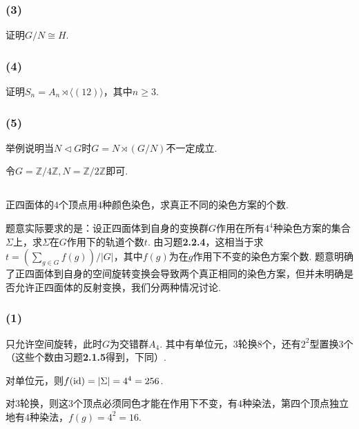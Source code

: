 
\subsubsection{(3)}
证明$G/N\cong H$.

\Proofbyintimidation

\subsubsection{(4)}
证明$S_n=A_n\rtimes\langle(12)\rangle$，其中$n\geq 3$.


\subsubsection{(5)}
举例说明当$N\vartriangleleft G$时$G=N\rtimes (G/N)$不一定成立.

\jie 令$G=\mathbb{Z}/4\mathbb{Z}, N=\mathbb{Z}/2\mathbb{Z}$即可.

\subsection{}
正四面体的$4$个顶点用$4$种颜色染色，求真正不同的染色方案的个数.

\jie
题意实际要求的是：设正四面体到自身的变换群$G$作用在所有$4^4$种染色方案的集合$\Sigma$上，求$\Sigma$在$G$作用下的轨道个数$t$. 由{\heiti 习题}\textbf{2.2.4}，这相当于求$t=(\sum_{g\in G}f(g))/|G|$，其中$f(g)$为在$g$作用下不变的染色方案个数. 题意明确了正四面体到自身的空间旋转变换会导致两个真正相同的染色方案，但并未明确是否允许正四面体的反射变换，我们分两种情况讨论.

\subsubsection{(1)}
只允许空间旋转，此时$G$为交错群$A_4$. 其中有单位元，$3$轮换$8$个，还有$2^2$型置换$3$个（这些个数由{\heiti 习题}\textbf{2.1.5}得到，下同）.

对单位元，则$f(\operatorname{id})=|\Sigma|=4^4=256$.

对$3$轮换，则这$3$个顶点必须同色才能在作用下不变，有$4$种染法，第四个顶点独立地有$4$种染法，$f(g)=4^2=16$.

